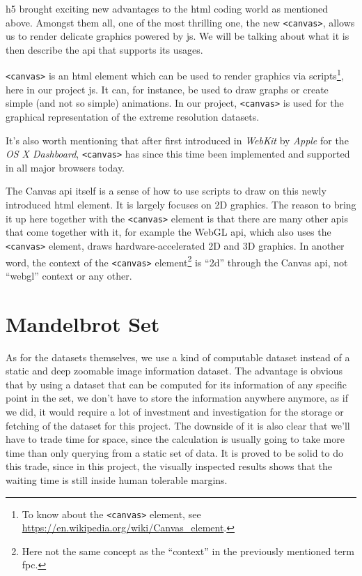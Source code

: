 \gls{h5} brought exciting new advantages to the \gls{html} coding world as mentioned above. Amongst them all, one of the most thrilling one, the new \texttt{<canvas>}, allows us to render delicate graphics powered by \gls{js}. We will be talking about what it is then describe the \gls{api} that supports its usages.

\texttt{<canvas>} is an \gls{html} element which can be used to render graphics via scripts\footnote{ To know about the \texttt{<canvas>} element, see \url{https://en.wikipedia.org/wiki/Canvas_element}.}, here in our project \gls{js}. It can, for instance, be used to draw graphs or create simple (and not so simple) animations. In our project, \texttt{<canvas>} is used for the graphical representation of the extreme resolution datasets.

It's also worth mentioning that after first introduced in \emph{WebKit} by \emph{Apple} for the \emph{OS X Dashboard}, \texttt{<canvas>} has since this time been implemented and supported in all major browsers today.

The Canvas \gls{api} itself is a sense of how to use scripts to draw on this newly introduced \gls{html} element. It is largely focuses on 2D graphics. The reason to bring it up here together with the \texttt{<canvas>} element is that there are many other \gls{api}s that come together with it, for example the WebGL \gls{api}, which also uses the \texttt{<canvas>} element, draws hardware-accelerated 2D and 3D graphics. In another word, the context of the \texttt{<canvas>} element\footnote{ Here not the same concept as the ``context'' in the previously mentioned term \gls{fpc}.} is ``2d'' through the Canvas \gls{api}, not ``webgl'' context or any other.


\section{Mandelbrot Set}

As for the datasets themselves, we use a kind of computable dataset instead of a static and deep zoomable image information dataset. The advantage is obvious that by using a dataset that can be computed for its information of any specific point in the set, we don't have to store the information anywhere anymore, as if we did, it would require a lot of investment and investigation for the storage or fetching of the dataset for this project. The downside of it is also clear that we'll have to trade time for space, since the calculation is usually going to take more time than only querying from a static set of data. It is proved to be solid to do this trade, since in this project, the visually inspected results shows that the waiting time is still inside human tolerable margins.

